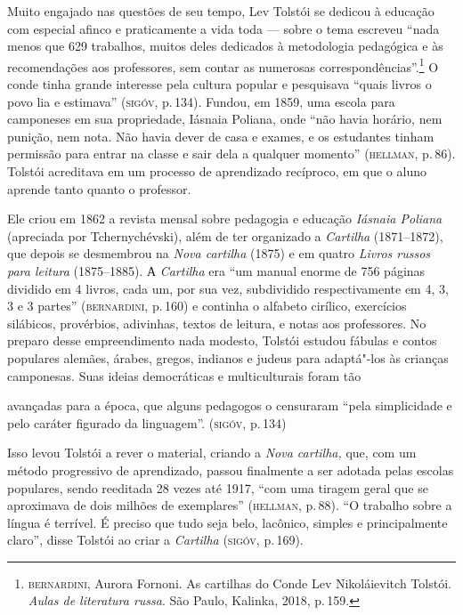 Muito engajado nas questões de seu tempo, Lev Tolstói se dedicou à
educação com especial afinco e praticamente a vida toda --- sobre o tema
escreveu ``nada menos que 629 trabalhos, muitos deles dedicados à
metodologia pedagógica e às recomendações aos professores, sem contar as
numerosas correspondências''.\footnote{\textsc{bernardini}, Aurora Fornoni. As
  cartilhas do Conde Lev Nikoláievitch Tolstói. \emph{Aulas de
  literatura russa}. São Paulo, Kalinka, 2018, p.\,159.} O conde
tinha grande interesse pela cultura popular e pesquisava ``quais livros
o povo lia e estimava'' (\textsc{sigóv}, p.\,134). Fundou, em 1859, uma escola
para camponeses em sua propriedade, Iásnaia Poliana, onde ``não
havia horário, nem punição, nem nota. Não havia dever de casa e exames,
e os estudantes tinham permissão para entrar na classe e sair dela a
qualquer momento'' (\textsc{hellman}, p.\,86). Tolstói acreditava em um processo
de aprendizado recíproco, em que o aluno aprende tanto quanto o
professor.

Ele criou em 1862 a revista mensal sobre pedagogia e educação
\emph{Iásnaia Poliana} (apreciada por Tchernychévski), além de ter
organizado a \emph{Cartilha} (1871--1872), que depois se desmembrou na
\emph{Nova cartilha} (1875) e em quatro \emph{Livros russos para
leitura} (1875--1885). А \emph{Cartilha} era ``um manual enorme
de 756 páginas dividido em 4 livros, cada um, por sua vez, subdividido
respectivamente em 4, 3, 3 e 3 partes'' (\textsc{bernardini}, p.\,160) e continha
o alfabeto cirílico, exercícios silábicos, provérbios, adivinhas, textos
de leitura, e notas aos professores. No preparo desse empreendimento
nada modesto, Tolstói estudou fábulas e contos populares alemães,
árabes, gregos, indianos e judeus para adaptá"-los às crianças
camponesas. Suas ideias democráticas e multiculturais foram tão

avançadas para a época, que alguns pedagogos o censuraram ``pela
simplicidade e pelo caráter figurado da linguagem''. (\textsc{sigóv}, p.\,134)

Isso levou Tolstói a rever o material, criando a \emph{Nova cartilha,}
que, com um método progressivo de aprendizado, passou finalmente a ser
adotada pelas escolas populares, sendo reeditada 28 vezes até 1917,
``com uma tiragem geral que se aproximava de dois milhões de
exemplares'' (\textsc{hellman}, p.\,88). ``O trabalho sobre a língua é terrível. É
preciso que tudo seja belo, lacônico, simples e principalmente claro'',
disse Tolstói ao criar a \emph{Cartilha} (\textsc{sigóv}, p.\,169).

